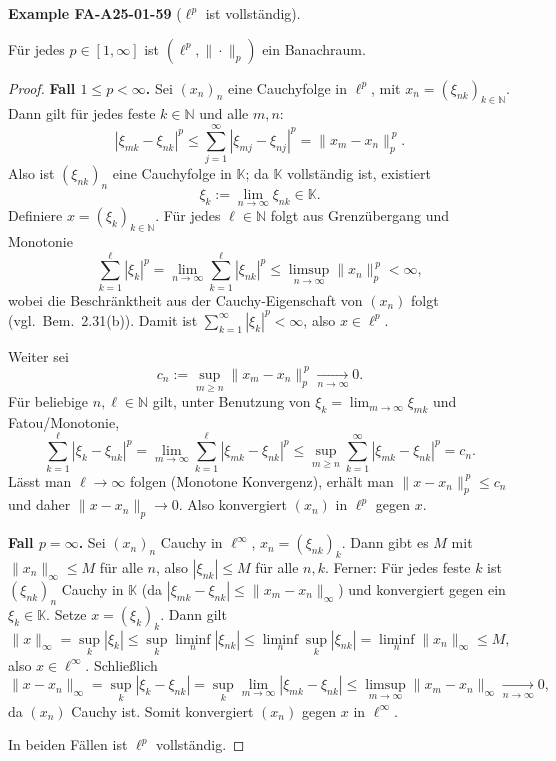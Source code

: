 \documentclass[10pt, letterpaper]{article}
\newcommand{\CustomHeading}[3]{%
  \par\medskip\noindent%
  \textbf{#1 #2} \textnormal{(#3)}.\enskip%
}
\newenvironment{EXA}[2]{\begin{unitbox}\CustomHeading{Example}{#1}{#2}}{\end{unitbox}}
\begin{document}
\begin{EXA}{FA-A25-01-59}{$\ell^{p}$ ist vollständig}
Für jedes $p\in[1,\infty]$ ist $(\ell^{p},\|\cdot\|_{p})$ ein Banachraum.

\begin{proof}
\textbf{Fall $1\le p<\infty$.}
Sei $(x_n)_{n}$ eine Cauchyfolge in $\ell^{p}$, mit $x_n=(\xi_{nk})_{k\in\mathbb{N}}$.
Dann gilt für jedes feste $k\in\mathbb{N}$ und alle $m,n$:
\[
|\xi_{mk}-\xi_{nk}|^{p}\le \sum_{j=1}^{\infty}|\xi_{mj}-\xi_{nj}|^{p}=\|x_m-x_n\|_{p}^{\,p}.
\]
Also ist $(\xi_{nk})_n$ eine Cauchyfolge in $\mathbb{K}$; da $\mathbb{K}$ vollständig ist, existiert
\[
\xi_k:=\lim_{n\to\infty}\xi_{nk}\in\mathbb{K}.
\]
Definiere $x=(\xi_k)_{k\in\mathbb{N}}$. Für jedes $\ell\in\mathbb{N}$ folgt aus Grenzübergang und Monotonie
\[
\sum_{k=1}^{\ell}|\xi_k|^{p}
=\lim_{n\to\infty}\sum_{k=1}^{\ell}|\xi_{nk}|^{p}
\le \limsup_{n\to\infty}\|x_n\|_{p}^{\,p}<\infty,
\]
wobei die Beschränktheit aus der Cauchy-Eigenschaft von $(x_n)$ folgt (vgl.\ Bem.~2.31(b)). 
Damit ist $\sum_{k=1}^{\infty}|\xi_k|^{p}<\infty$, also $x\in\ell^{p}$.

Weiter sei
\[
c_n:=\sup_{m\ge n}\|x_m-x_n\|_{p}^{\,p}\xrightarrow[n\to\infty]{}0.
\]
Für beliebige $n,\ell\in\mathbb{N}$ gilt, unter Benutzung von $\xi_k=\lim_{m\to\infty}\xi_{mk}$ und Fatou/Monotonie,
\[
\sum_{k=1}^{\ell}|\xi_k-\xi_{nk}|^{p}
=\lim_{m\to\infty}\sum_{k=1}^{\ell}|\xi_{mk}-\xi_{nk}|^{p}
\le \sup_{m\ge n}\sum_{k=1}^{\infty}|\xi_{mk}-\xi_{nk}|^{p}
= c_n.
\]
Lässt man $\ell\to\infty$ folgen (Monotone Konvergenz), erhält man $\|x-x_n\|_{p}^{\,p}\le c_n$ und daher
$\|x-x_n\|_{p}\to0$. Also konvergiert $(x_n)$ in $\ell^{p}$ gegen $x$.

\medskip
\textbf{Fall $p=\infty$.}
Sei $(x_n)_n$ Cauchy in $\ell^{\infty}$, $x_n=(\xi_{nk})_{k}$. Dann gibt es $M$ mit
$\|x_n\|_{\infty}\le M$ für alle $n$, also $|\xi_{nk}|\le M$ für alle $n,k$.
Ferner: Für jedes feste $k$ ist $(\xi_{nk})_n$ Cauchy in $\mathbb{K}$ (da
$|\xi_{mk}-\xi_{nk}|\le \|x_m-x_n\|_{\infty}$) und konvergiert gegen ein $\xi_k\in\mathbb{K}$.
Setze $x=(\xi_k)_k$. Dann gilt
\[
\|x\|_{\infty}=\sup_{k}|\xi_k|\le \sup_{k}\liminf_{n}|\xi_{nk}|
\le \liminf_{n}\sup_{k}|\xi_{nk}|=\liminf_{n}\|x_n\|_{\infty}\le M,
\]
also $x\in\ell^{\infty}$. Schließlich
\[
\|x-x_n\|_{\infty}=\sup_{k}|\xi_k-\xi_{nk}|
=\sup_{k}\lim_{m\to\infty}|\xi_{mk}-\xi_{nk}|
\le \limsup_{m\to\infty}\|x_m-x_n\|_{\infty}\xrightarrow[n\to\infty]{}0,
\]
da $(x_n)$ Cauchy ist. Somit konvergiert $(x_n)$ gegen $x$ in $\ell^{\infty}$.

In beiden Fällen ist $\ell^{p}$ vollständig.
\end{proof}
\end{EXA}
\end{document}
